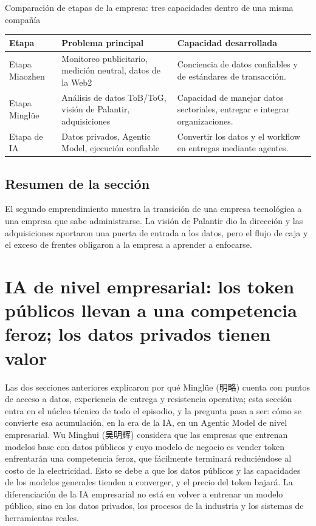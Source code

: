 \documentclass[a4paper]{article}
\begin{document}
\begin{knowledgebox}{Comparación de etapas de la empresa: tres capacidades dentro de una misma compañía}
\begin{tabularx}{\textwidth}{p{}p{}X}
\toprule
Etapa & Problema principal & Capacidad desarrollada \\
\midrule
Etapa Miaozhen & Monitoreo publicitario, medición neutral, datos de la Web2 & Conciencia de datos confiables y de estándares de transacción. \\
Etapa Minglüe & Análisis de datos ToB/ToG, visión de Palantir, adquisiciones & Capacidad de manejar datos sectoriales, entregar e integrar organizaciones. \\
Etapa de IA & Datos privados, Agentic Model, ejecución confiable & Convertir los datos y el workflow en entregas mediante agentes. \\
\bottomrule
\end{tabularx}
\end{knowledgebox}

\subsection{Resumen de la sección}

El segundo emprendimiento muestra la transición de una empresa tecnológica a una empresa que sabe administrarse. La visión de Palantir dio la dirección y las adquisiciones aportaron una puerta de entrada a los datos, pero el flujo de caja y el exceso de frentes obligaron a la empresa a aprender a enfocarse.
\section{IA de nivel empresarial: los token públicos llevan a una competencia feroz; los datos privados tienen valor}

Las dos secciones anteriores explicaron por qué Minglüe (明略) cuenta con puntos de acceso a datos, experiencia de entrega y resistencia operativa; esta sección entra en el núcleo técnico de todo el episodio, y la pregunta pasa a ser: cómo se convierte esa acumulación, en la era de la IA, en un Agentic Model de nivel empresarial. Wu Minghui (吴明辉) considera que las empresas que entrenan modelos base con datos públicos y cuyo modelo de negocio es vender token enfrentarán una competencia feroz, que fácilmente terminará reduciéndose al costo de la electricidad. Esto se debe a que los datos públicos y las capacidades de los modelos generales tienden a converger, y el precio del token bajará. La diferenciación de la IA empresarial no está en volver a entrenar un modelo público, sino en los datos privados, los procesos de la industria y los sistemas de herramientas reales.
\end{document}
